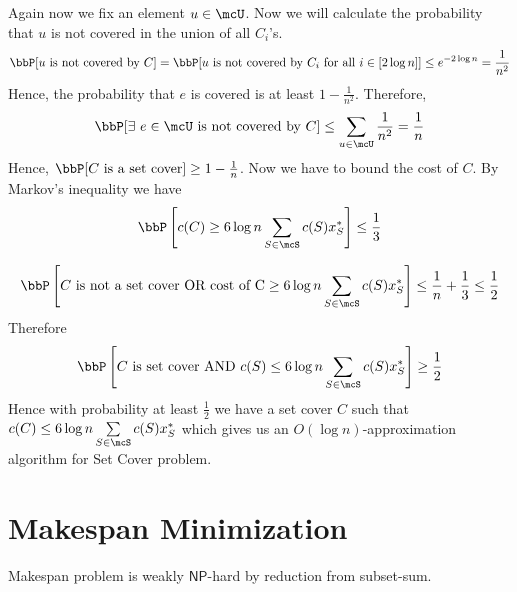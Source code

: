 Again now we fix an element $u\in \mcU$. Now we will calculate the probability that $u$ is not covered in the union of all $C_i$'s. $$\bbP[u \text{ is not covered by }C]=\bbP[u \text{ is not covered by }C_i\text{ for all }i\in [2\log n]]\leq e^{-2\log n}=\frac{1}{n^2}$$
Hence, the probability that $e$ is covered is at least $1-\frac{1}{n^2}$. Therefore, $$\bbP[\exs\ e\in\mcU\text{ is not covered by }C]\leq \sum\limits_{u\in\mcU}\frac1{n^2}=\frac1n$$Hence, $\bbP[C\text{ is a set cover}]\geq 1-\frac1n$. Now we have to bound the cost of $C$. By Markov's inequality we have $$\bbP\lt[c(C)\geq 6\log n\sum\limits_{S\in\mcS}c(S)x^*_S\rt]\leq \frac13$$

$$\bbP\lt[C\text{ is not a set cover OR cost of C}\geq 6\log n\sum\limits_{S\in\mcS}c(S)x^*_S\rt]\leq \frac1n+\frac13\leq \frac12$$Therefore $$\bbP\lt[C\text{ is  set cover AND }c(S)\leq 6\log n\sum\limits_{S\in\mcS}c(S)x^*_S\rt]\geq \frac12$$Hence with probability at least $\frac12$ we have a set cover $C$ such that $c(C)\leq 6\log n\sum\limits_{S\in\mcS}c(S)x^*_S$ which gives us an $O(\log n)$-approximation algorithm for Set Cover problem.\parinn




\newpage

\section{Makespan Minimization}
\begin{algoprob}
\end{algoprob} 
\begin{Theorem}{}{}
    Makespan problem is weakly $\mathsf{NP}$-hard by reduction from subset-sum.
\end{Theorem}

